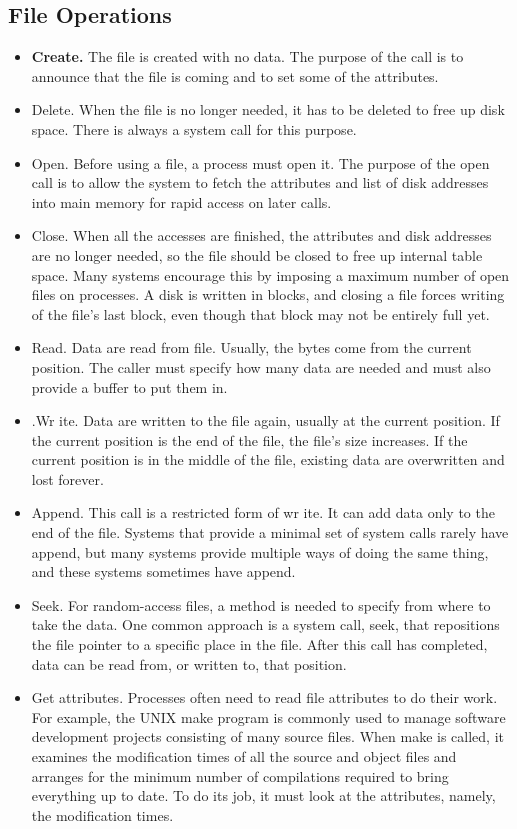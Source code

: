 \subsection{File Operations}
\begin{itemize}
    \item \textbf{Create.} The file is created with no data. The purpose of the call is to announce that the file is coming and to set some of the attributes.
    \item Delete. When the file is no longer needed, it has to be deleted to free up disk space. There is always a system call for this purpose.
    \item Open. Before using a file, a process must open it. The purpose of the open call is to allow the system to fetch the attributes and list of disk addresses into main memory for rapid access on later calls.
    \item Close. When all the accesses are finished, the attributes and disk addresses are no longer needed, so the file should be closed to free up internal table space. Many systems encourage this by imposing a maximum number of open files on processes. A disk is written in blocks, and closing a file forces writing of the file’s last block, even though that block may not be entirely full yet.
    \item Read. Data are read from file. Usually, the bytes come from the current position. The caller must specify how many data are needed and must also provide a buffer to put them in.
    \item .Wr ite. Data are written to the file again, usually at the current position. If the current position is the end of the file, the file’s size increases. If the current position is in the middle of the file, existing data are overwritten and lost forever.
    \item Append. This call is a restricted form of wr ite. It can add data only to the end of the file. Systems that provide a minimal set of system calls rarely have append, but many systems provide multiple ways of doing the same thing, and these systems sometimes have append.
    \item Seek. For random-access files, a method is needed to specify from where to take the data. One common approach is a system call, seek, that repositions the file pointer to a specific place in the file. After this call has completed, data can be read from, or written to, that position.
    \item Get attributes. Processes often need to read file attributes to do their work. For example, the UNIX make program is commonly used to manage software development projects consisting of many source files. When make is called, it examines the modification times of all the source and object files and arranges for the minimum number of compilations required to bring everything up to date. To do its job, it must look at the attributes, namely, the modification times.

\end{itemize}
